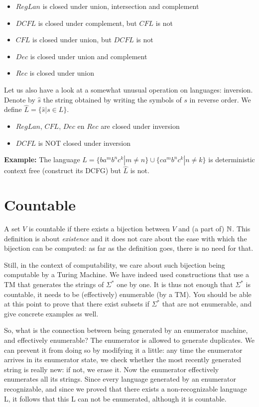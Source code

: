 \begin{itemize}
\item[] $RegLan$ is closed under union, intersection and complement
\item[] $DCFL$ is closed under complement, but $CFL$ is not
\item[] $CFL$ is closed under union, but $DCFL$ is not
\item[] $Dec$ is closed under union and complement
\item[] $Rec$ is closed under union
\end{itemize}

Let us also have a look at a somewhat unusual operation on languages:
inversion. Denote by $\hat{s}$ the string obtained by writing the
symbols of $s$ in reverse order. We define $\widehat{L} = \{\hat{s}|s
\in L\}$.

\begin{itemize}
\item[] $RegLan$, $CFL$, $Dec$ en $Rec$ are closed under inversion
\item[] $DCFL$ is NOT closed under inversion
\end{itemize}

{\bf Example:} The language
%
$L = \{ba^mb^nc^k|m \neq n\} \cup \{ca^mb^nc^k|n \neq k\}$ is 
deterministic context free (construct its DCFG) but $\widehat{L}$ is
not.


\section{Countable}

A set $V$ is countable if there exists a bijection between $V$ and (a
part of) $\mathbb{N}$. This definition is about {\em existence} and it does
not care about the ease with which the bijection can be computed: as
far as the definition goes, there is no need for that.

Still, in the context of computability, we care about such bijection
being computable by a Turing Machine. We have indeed used
constructions that use a TM that generates the strings of $\Sigma^*$
one by one. It is thus not enough that $\Sigma^*$ is countable, it
needs to be (effectively) enumerable (by a TM). You should be able at
this point to prove that there exist subsets if $\Sigma^*$ that are
not enumerable, and give concrete examples as well.

So, what is the connection between being generated by an enumerator
machine, and effectively enumerable? The enumerator is allowed to
generate duplicates. We can prevent it from doing so by modifying it a
little: any time the enumerator arrives in its enumerator state, we
check whether the most recently generated string is really new: if
not, we erase it. Now the enumerator effectively enumerates all its
strings. Since every language generated by an enumerator recognizable,
and since we proved that there exists a non-recognizable language L,
it follows that this L can not be enumerated, although it is
countable.

